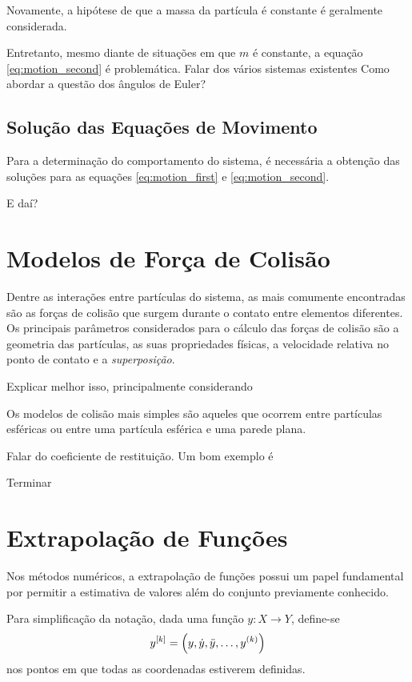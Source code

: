 Novamente, a hipótese de que a massa da partícula é constante é geralmente considerada. 

Entretanto, mesmo diante de situações em que \(m\) é constante, a equação \eqref{eq:motion_second} é problemática. 
\alert{Falar dos vários sistemas existentes}
\alert{Como abordar a questão dos ângulos de Euler?}

\subsection{Solução das Equações de Movimento}

Para a determinação do comportamento do sistema, é necessária a obtenção das soluções para as equações \eqref{eq:motion_first} e \eqref{eq:motion_second}.

\alert{E daí?}

\section{Modelos de Força de Colisão} \label{sec:collision_force_models}

Dentre as interações entre partículas do sistema, as mais comumente encontradas são as forças de colisão que surgem durante o contato entre elementos diferentes. Os principais parâmetros considerados para o cálculo das forças de colisão são a geometria das partículas, as suas propriedades físicas, a velocidade relativa no ponto de contato e a \textit{superposição}.

\alert{Explicar melhor isso, principalmente considerando }

Os modelos de colisão mais simples são aqueles que ocorrem entre partículas esféricas ou entre uma partícula esférica e uma parede plana.

\alert{Falar do coeficiente de restituição. Um bom exemplo é }


\alert{Terminar}

\section{Extrapolação de Funções}
\label{sec:extrapolation}

Nos métodos numéricos, a extrapolação de funções possui um papel fundamental por permitir a estimativa de valores além do conjunto previamente conhecido.

Para simplificação da notação, dada uma função \(y: X\to Y\), define-se
\[\drvec{\taylorOrder}{y} = \pqty{y, \deriv{1}{y}, \deriv{2}{y}, \dots, \deriv{\taylorOrder}{y}}\]
nos pontos em que todas as coordenadas estiverem definidas.

